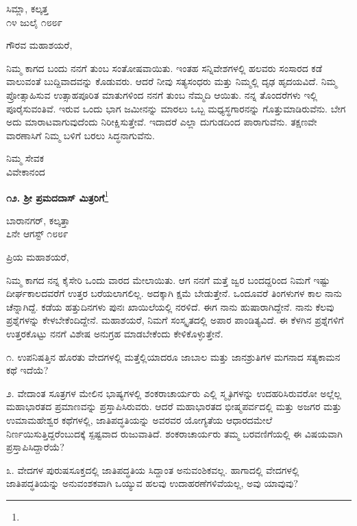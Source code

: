 \begin{flushright}
ಸಿಮ್ಲಾ, ಕಲ್ಕತ್ತ\\೧೪ ಜುಲೈ ೧೮೮೯
\end{flushright}

\noindent
ಗೌರವ ಮಹಾಶಯರೆ,

ನಿಮ್ಮ ಕಾಗದ ಬಂದು ನನಗೆ ತುಂಬ ಸಂತೋಷವಾಯಿತು. ಇಂತಹ ಸನ್ನಿವೇಶಗಳಲ್ಲಿ ಹಲವರು ಸಂಸಾರದ ಕಡೆ ವಾಲುವಂತೆ ಬುದ್ದಿವಾದವನ್ನು ಕೊಡುವರು. ಆದರೆ ನೀವು ಸತ್ಯಸಂಧರು ಮತ್ತು ನಿಮ್ಮಲ್ಲಿ ದೃಢ ಹೃದಯವಿದೆ. ನಿಮ್ಮ ಪ್ರೋತ್ಸಾಹಿಸುವ ಉತ್ಸಾಹಪೂರಿತ ಮಾತುಗಳಿಂದ ನನಗೆ ತುಂಬ ನೆಮ್ಮದಿ ಆಯಿತು. ನನ್ನ ತೊಂದರೆಗಳು ಇಲ್ಲಿ ಪೂರೈಸುವಂತಿವೆ. ಇರುವ ಒಂದು ಭಾಗ ಜಮೀನನ್ನು ಮಾರಲು ಒಬ್ಬ ಮಧ್ಯಸ್ಥಗಾರನನ್ನು ಗೊತ್ತುಮಾಡಿರುವೆನು. ಬೇಗ ಅದು ಮಾರಾಟವಾಗುವುದೆಂದು ನಿರೀಕ್ಷಿಸುತ್ತೇವೆ. ಇದಾದರೆ ಎಲ್ಲಾ ದುಗುಡದಿಂದ ಪಾರಾಗುವೆನು. ತಕ್ಷಣವೇ ವಾರಣಾಸಿಗೆ ನಿಮ್ಮ ಬಳಿಗೆ ಬರಲು ಸಿದ್ಧನಾಗುವೆನು.

{\flushright
ನಿಮ್ಮ ಸೇವಕ\\ವಿವೇಕಾನಂದ\par}

\begin{center}
\textbf{೧೨. ಶ‍್ರೀ ಪ್ರಮದದಾಸ್ ಮಿತ್ರರಿಗೆ}\footnote{}
\end{center}

\begin{flushright}
ಬಾರಾನಗರ್, ಕಲ್ಕತ್ತಾ\\೭ನೇ ಆಗಸ್ಟ್ ೧೮೮೯
\end{flushright}

\noindent
ಪ್ರಿಯ ಮಹಾಶಯರೆ,

ನಿಮ್ಮ ಕಾಗದ ನನ್ನ ಕೈಸೇರಿ ಒಂದು ವಾರದ ಮೇಲಾಯಿತು. ಆಗ ನನಗೆ ಮತ್ತೆ ಜ್ವರ ಬಂದದ್ದರಿಂದ ನಿಮಗೆ ಇಷ್ಟು ದೀರ್ಘಕಾಲದವರೆಗೆ ಉತ್ತರ ಬರೆಯಲಾಗಲಿಲ್ಲ. ಅದಕ್ಕಾಗಿ ಕ್ಷಮೆ ಬೇಡುತ್ತೇನೆ. ಒಂದೂವರೆ ತಿಂಗಳುಗಳ ಕಾಲ ನಾನು ಚೆನ್ನಾಗಿದ್ದೆ. ಕಡೆಯ ಹತ್ತುದಿನಗಳು ಪುನಃ ಖಾಯಿಲೆಯಲ್ಲಿ ನರಳಿದೆ. ಈಗ ನಾನು ಹುಷಾರಾಗಿದ್ದೇನೆ. ನಾನು ಕೆಲವು ಪ್ರಶ್ನೆಗಳನ್ನು ಕೇಳಬೇಕೆಂದಿದ್ದೇನೆ. ಮಹಾಶಯರೆ, ನಿಮಗೆ ಸಂಸ್ಕೃತದಲ್ಲಿ ಅಪಾರ ಪಾಂಡಿತ್ಯವಿದೆ. ಈ ಕೆಳಗಿನ ಪ್ರಶ್ನೆಗಳಿಗೆ ಉತ್ತರಕೊಟ್ಟು ನನಗೆ ವಿಶೇಷ ಅನುಗ್ರಹ ಮಾಡಬೇಕೆಂದು ಕೇಳಿಕೊಳ್ಳುತ್ತೇನೆ.

೧. ಉಪನಿಷತ್ತಿನ ಹೊರತು ವೇದಗಳಲ್ಲಿ ಮತ್ತೆಲ್ಲಿಯಾದರೂ ಜಾಬಾಲ ಮತ್ತು ಜಾನಶ್ರುತಿಗಳ ಮಗನಾದ ಸತ್ಯಕಾಮನ ಕಥೆ ಇದೆಯೆ?

೨. ವೇದಾಂತ ಸೂತ್ರಗಳ ಮೇಲಿನ ಭಾಷ್ಯಗಳಲ್ಲಿ ಶಂಕರಾಚಾರ್ಯರು ಎಲ್ಲಿ ಸ್ಮೃತಿಗಳನ್ನು ಉದಹರಿಸಿರುವರೋ ಅಲ್ಲೆಲ್ಲ ಮಹಾಭಾರತದ ಪ್ರಮಾಣವನ್ನು ಪ್ರಸ್ತಾಪಿಸಿರುವರು. ಆದರೆ ಮಹಾಭಾರತದ ಭೀಷ್ಮಪರ್ವದಲ್ಲಿ ಮತ್ತು ಅಜಗರ ಮತ್ತು ಉಮಾಮಹೇಶ್ವರ ಕಥೆಗಳಲ್ಲಿ, ಜಾತಿಪದ್ಧತಿಯನ್ನು ಅವರವರ ಯೋಗ್ಯತೆಯ ಆಧಾರದಮೇಲೆ ನಿರ್ಣಯಿಸುತ್ತಿದ್ದರೆಂಬುದಕ್ಕೆ ಸ್ಪಷ್ಟವಾದ ರುಜುವಾತಿದೆ. ಶಂಕರಾಚಾರ್ಯರು ತಮ್ಮ ಬರವಣಿಗೆಯಲ್ಲಿ ಈ ವಿಷಯವಾಗಿ ಪ್ರಸ್ತಾಪಿಸಿದ್ದಾರೆಯೆ?

೩. ವೇದಗಳ ಪುರುಷಸೂಕ್ತದಲ್ಲಿ ಜಾತಿಪದ್ಧತಿಯ ಸಿದ್ದಾಂತ ಅನುವಂಶಿಕವಲ್ಲ. ಹಾಗಾದಲ್ಲಿ ವೇದಗಳಲ್ಲಿ ಜಾತಿಪದ್ಧತಿಯನ್ನು ಅನುವಂಶಕವಾಗಿ ಒಯ್ಯುವ ಹಲವು ಉದಾಹರಣೆಗಳಿವೆಯಲ್ಲ, ಅವು ಯಾವುವು?

